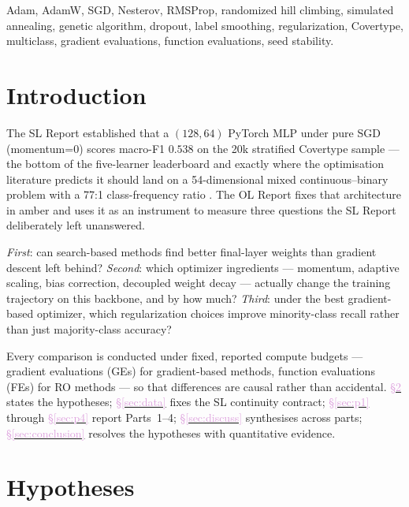 \documentclass[conference]{IEEEtran}
\newcommand{\secref}[1]{\hyperref[#1]{\textcolor{plum}{\S\ref*{#1}}}}
\begin{document}
\begin{IEEEkeywords}
Adam, AdamW, SGD, Nesterov, RMSProp, randomized hill climbing, simulated
annealing, genetic algorithm, dropout, label smoothing, regularization,
Covertype, multiclass, gradient evaluations, function evaluations, seed stability.
\end{IEEEkeywords}

\section{Introduction}\label{sec:intro}

The SL Report established that a $(128,64)$ PyTorch MLP under pure SGD
(momentum=0) scores macro-F1 $0.538$ on the 20k stratified Covertype sample
--- the bottom of the five-learner leaderboard and exactly where the
optimisation literature predicts it should land on a 54-dimensional mixed
continuous--binary problem with a 77:1 class-frequency ratio
\cite{wolpert1996nfl,ruder2017overview,loshchilov2019adamw}.
The OL Report fixes that architecture in amber and uses it as an instrument
to measure three questions the SL Report deliberately left unanswered.

\textit{First}: can search-based methods find better final-layer weights than
gradient descent left behind?
\textit{Second}: which optimizer ingredients --- momentum, adaptive scaling,
bias correction, decoupled weight decay --- actually change the training
trajectory on this backbone, and by how much?
\textit{Third}: under the best gradient-based optimizer, which regularization
choices improve minority-class recall rather than just majority-class accuracy?

Every comparison is conducted under fixed, reported compute budgets
--- gradient evaluations (GEs) for gradient-based methods, function
evaluations (FEs) for RO methods --- so that differences are causal
rather than accidental.
\secref{sec:hyp} states the hypotheses; \secref{sec:data} fixes the SL
continuity contract; \secref{sec:p1} through \secref{sec:p4} report Parts~1--4;
\secref{sec:discuss} synthesises across parts; \secref{sec:conclusion}
resolves the hypotheses with quantitative evidence.

\section{Hypotheses}\label{sec:hyp}
\end{document}
